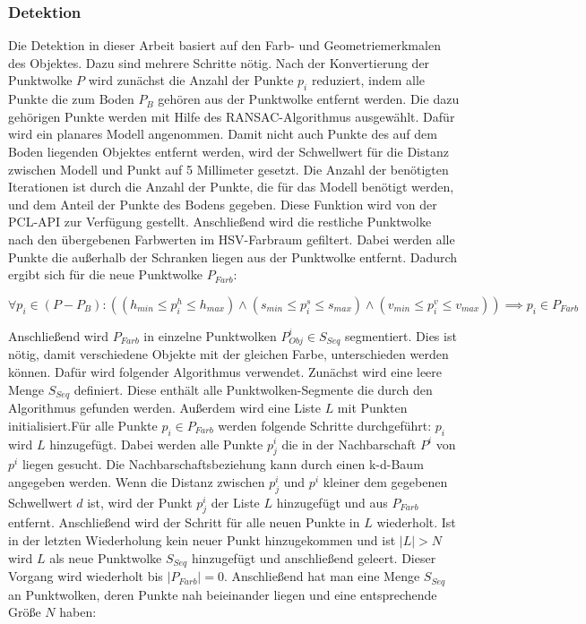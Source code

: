 \subsubsection{Detektion}
Die Detektion in dieser Arbeit basiert auf den Farb- und Geometriemerkmalen des Objektes. Dazu sind mehrere Schritte nötig. Nach der Konvertierung der Punktwolke $P$ wird zunächst die Anzahl der Punkte $p_i$ reduziert, indem alle Punkte die zum Boden $P_B$ gehören aus der Punktwolke entfernt werden. Die dazu gehörigen Punkte werden mit Hilfe des RANSAC-Algorithmus ausgewählt. Dafür wird ein planares Modell angenommen. Damit nicht auch Punkte des auf dem Boden liegenden Objektes entfernt werden, wird der Schwellwert für die Distanz zwischen Modell und Punkt auf 5 Millimeter gesetzt. Die Anzahl der benötigten Iterationen ist durch die Anzahl der Punkte, die für das Modell benötigt werden, und dem Anteil der Punkte des Bodens gegeben. Diese Funktion wird von der PCL-API zur Verfügung gestellt. Anschließend wird die restliche Punktwolke nach den übergebenen Farbwerten im HSV-Farbraum gefiltert. Dabei werden alle Punkte die außerhalb der Schranken liegen aus der Punktwolke entfernt. Dadurch ergibt sich für die neue Punktwolke $P_{Farb}$:

\begin{equation}
	\forall p_i \in (P - P_B): ((h_{min} \leq p_i^h \leq h_{max}) \wedge (s_{min} \leq p_i^s \leq s_{max}) \wedge (v_{min} \leq p_i^v \leq v_{max})) 
	\implies p_i \in P_{Farb}
\end{equation}

Anschließend wird $P_{Farb}$ in einzelne Punktwolken $P_{Obj}^i \in S_{Seq}$ segmentiert. Dies ist nötig, damit verschiedene Objekte mit der gleichen Farbe, unterschieden werden können. Dafür wird folgender Algorithmus verwendet. Zunächst wird eine leere Menge $S_{Seq}$ definiert. Diese enthält alle Punktwolken-Segmente die durch den Algorithmus gefunden werden. Außerdem wird eine Liste $L$ mit Punkten initialisiert.Für alle Punkte $p_i \in P_{Farb}$ werden folgende Schritte durchgeführt: $p_i$ wird $L$ hinzugefügt. Dabei werden alle Punkte $p^i_j$ die in der Nachbarschaft $P^i$ von $p^i$ liegen gesucht.  Die Nachbarschaftsbeziehung kann durch einen k-d-Baum angegeben werden. Wenn die Distanz zwischen $p^i_j$ und $p^i$ kleiner dem gegebenen Schwellwert $d$ ist, wird der Punkt $p^i_j$ der Liste $L$ hinzugefügt und aus $P_{Farb}$ entfernt. Anschließend wird der Schritt für alle neuen Punkte in $L$ wiederholt. Ist in der letzten Wiederholung kein neuer Punkt hinzugekommen und ist $|L| > N$ wird $L$ als neue Punktwolke $S_{Seq}$ hinzugefügt und anschließend geleert. Dieser Vorgang wird wiederholt bis $|P_{Farb}| = 0$. Anschließend hat man eine Menge $S_{Seq}$ an Punktwolken, deren Punkte nah beieinander liegen und eine entsprechende Größe $N$ haben:

